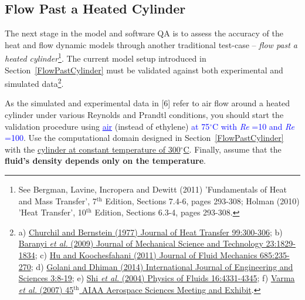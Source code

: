 \documentclass[12pts,a4paper,amsmath,amssymb,floatfix]{article}%
\newcommand{\blue}{\textcolor{blue}}
\newcommand\Rey{\mbox{\textit{Re}}\,\,}
\begin{document}

     \subsection{Flow Past a Heated Cylinder}\label{FlowPastHeatedCylinder}
     The next stage in the model and software QA is to assess the accuracy of the heat and flow dynamic models through another traditional test-case -- {\it flow past a heated cylinder}\footnote{See Bergman, Lavine, Incropera and Dewitt (2011) 'Fundamentals of Heat and Mass Transfer', 7$^{\text{th}}$ Edition, Sections 7.4-6, pages 293-308; Holman (2010) 'Heat Transfer', 10$^{\text{th}}$ Edition, Sections 6.3-4, pages 293-308.}. The current model setup introduced in Section~\ref{FlowPastCylinder} must be validated against both experimental and simulated data\footnote{a) \href{https://doi.org/10.1115/1.3450685}{Churchil and Bernstein (1977) Journal of Heat Transfer 99:300-306}; b) \href{https://link.springer.com/article/10.1007/s12206-009-0610-2}{Baranyi {\it et al.} (2009) Journal of Mechanical Science and Technology 23:1829-1834}; c) \href{https://doi.org/10.1017/jfm.2011.313}{Hu and Koochesfahani (2011) Journal of Fluid Mechanics 685:235-270}; d) \href{http://www.theijes.com/papers/v3-i3/Version-4/B0334008019.pdf}{Golani and Dhiman (2014) International Journal of Engineering and Sciences 3:8-19}; e) \href{http://aip.scitation.org/doi/pdf/10.1063/1.1804547}{Shi {\it et al.} (2004) Physics of Fluids 16:4331-4345}; f) \href{http://dept.ku.edu/~cfdku/papers/aiaa-2007-0801.pdf}{Varma {\it et al.} (2007) 45$^{\text{th}}$ AIAA Aerospace Sciences Meeting and Exhibit}.}.

     As the simulated and experimental data in [6] refer to air flow around a heated cylinder under various Reynolds and Prandtl conditions, you should start the validation procedure using \blue{\underline{air}} (instead of ethylene) \blue{at 75$^{\circ}$C with \Rey=10 and \Rey=100}. Use the computational domain designed in Section~\ref{FlowPastCylinder} with the \underline{cylinder at constant temperature of 300$^{\circ}$C}. Finally, assume that the {\bf fluid's density depends only on the temperature}.
\end{document}

